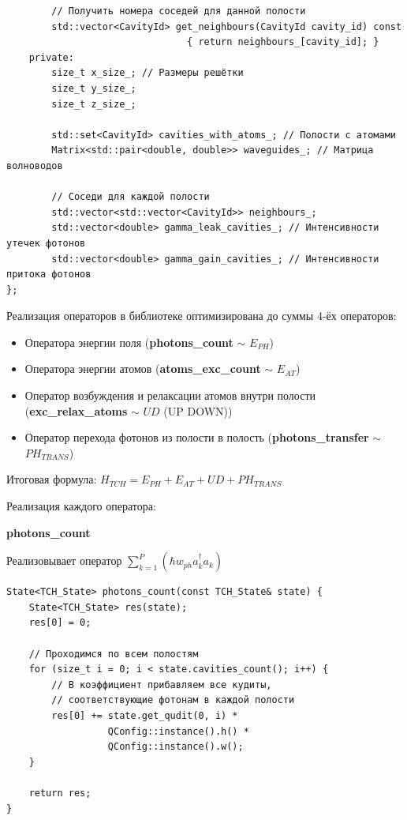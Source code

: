 \documentclass[12pt,fleqn]{article}
\begin{document}
\begin{mdframed}[linecolor=black, topline=true, bottomline=true,
leftline=false, rightline=false]
\begin{verbatim}
        // Получить номера соседей для данной полости
        std::vector<CavityId> get_neighbours(CavityId cavity_id) const 
                                { return neighbours_[cavity_id]; }
    private:
        size_t x_size_; // Размеры решётки
        size_t y_size_;
        size_t z_size_;

        std::set<CavityId> cavities_with_atoms_; // Полости с атомами
        Matrix<std::pair<double, double>> waveguides_; // Матрица волноводов

        // Соседи для каждой полости
        std::vector<std::vector<CavityId>> neighbours_; 
        std::vector<double> gamma_leak_cavities_; // Интенсивности утечек фотонов
        std::vector<double> gamma_gain_cavities_; // Интенсивности притока фотонов
};
\end{verbatim}
\end{mdframed}

        Реализация операторов в библиотеке оптимизирована до суммы 4-ёх операторов:
        \begin{itemize}
            \item{Оператора энергии поля (\textbf{photons\_count} $\sim$ $E_{PH}$)}
            \item{Оператора энергии атомов (\textbf{atoms\_exc\_count} $\sim$ $E_{AT}$)}
            \item{Оператор возбуждения и релаксации атомов внутри полости (\textbf{exc\_relax\_atoms} $\sim$ $UD$ (UP DOWN))}
            \item{Оператор перехода фотонов из полости в полость (\textbf{photons\_transfer} $\sim$ $PH_{TRANS}$)}
        \end{itemize}

        Итоговая формула:
        $H_{TCH} = E_{PH} + E_{AT} + UD + PH_{TRANS}$

        Реализация каждого оператора:

        \begin{center}
            \textbf{photons\_count}
        \end{center}

        Реализовывает оператор $\sum \limits_{k = 1}^{P}(\hbar{w_{ph}}{a^{\dagger}_k}{a_k})$

\begin{mdframed}[linecolor=black, topline=true, bottomline=true,
leftline=false, rightline=false]
\begin{verbatim}
State<TCH_State> photons_count(const TCH_State& state) {
    State<TCH_State> res(state);
    res[0] = 0;

    // Проходимся по всем полостям
    for (size_t i = 0; i < state.cavities_count(); i++) {
        // В коэффициент прибавляем все кудиты,
        // соответствующие фотонам в каждой полости
        res[0] += state.get_qudit(0, i) * 
                  QConfig::instance().h() * 
                  QConfig::instance().w();
    }

    return res;
}
\end{verbatim}
\end{mdframed}
            
\end{document}
